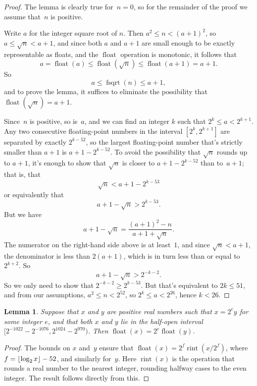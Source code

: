 \documentclass[a4paper]{article}
\DeclarePairedDelimiter\floor{\lfloor}{\rfloor}
\DeclareMathOperator{\fsqrt}{fsqrt}
\DeclareMathOperator{\float}{float}
\DeclareMathOperator{\rint}{rint}
\theoremstyle{plain}
\newtheorem{lemma}[theorem]{Lemma}
\theoremstyle{definition}
\begin{document}
\begin{proof}
  The lemma is clearly true for~$n=0$, so for the remainder of the proof
  we assume that~$n$ is positive.

  Write $a$ for the integer square root of $n$. Then $a^2 \le n < (a + 1)^2$,
  so $a \le \sqrt n < a + 1$, and since both $a$ and $a + 1$ are small
  enough to be exactly representable as floats, and the $\float$ operation
  is monotonic, it follows that
  $$a = \float(a) \le \float(\sqrt n) \le \float(a + 1) = a + 1.$$
  So
  $$a \le \fsqrt(n) \le a + 1,$$
  and to prove the lemma, it suffices to eliminate
  the possibility that~$\float(\sqrt n) = a + 1$.

  Since~$n$ is positive, so is~$a$, and we can find an integer $k$ such that
  $2^k \le a < 2^{k + 1}$. Any two consecutive floating-point numbers in the
  interval $[2^k, 2^{k+1}]$ are separated by exactly $2^{k-52}$, so the largest
  floating-point number that's strictly smaller than $a + 1$ is $a + 1 - 2^{k -
  52}.$ To avoid the possibility that $\sqrt n$ rounds up to $a + 1$, it's
  enough to show that $\sqrt n$ is closer to $a + 1 - 2^{k-52}$ than to~$a +
  1$; that is, that
  $$\sqrt n < a + 1 - 2^{k-53}$$
  or equivalently that
  $$a + 1 - \sqrt n > 2^{k - 53}.$$
  But we have
  $$a + 1 - \sqrt n = \frac{(a + 1)^2 - n}{a + 1 + \sqrt n}.$$
  The numerator on the right-hand side above is at least~$1$, and since $\sqrt
  n < a + 1$, the denominator is less than $2(a+1)$, which is in turn less than
  or equal to $2^{k+2}$. So
  $$a + 1 - \sqrt n > 2^{-k-2}.$$ So we only need to show that $2^{-k-2} \ge
  2^{k-53}$. But that's equivalent to $2k \le 51$, and from our assumptions,
  $a^2 \le n < 2^{52}$, so $2^k \le a < 2^{26}$, hence $k < 26$.
\end{proof}


\begin{lemma}\label{float_scale}
  Suppose that $x$ and $y$ are positive real numbers such that $x = 2^e y$ for
  some integer $e$, and that both $x$ and $y$ lie in the half-open interval
  $[2^{-1022} - 2^{-1076}, 2^{1024} - 2^{970})$. Then $\float(x) = 2^e
  \float(y)$.
\end{lemma}

\begin{proof}
  The bounds on $x$ and~$y$ ensure that $\float(x) = 2^f \rint(x / 2^f)$, where
  $f = \floor{\log_2 x} - 52$, and similarly for~$y$. Here $\rint(x)$ is the
  operation that rounds a real number to the nearest integer, rounding halfway
  cases to the even integer. The result follows directly from this.
\end{proof}
\end{document}
